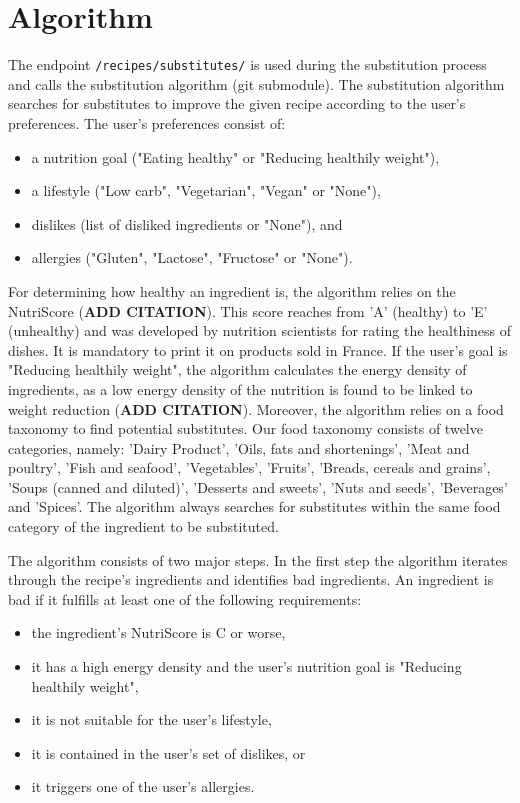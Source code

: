\section{Algorithm} \label{algorithm}
The endpoint \texttt{/recipes/substitutes/} is used during the substitution process and calls the substitution algorithm (git submodule). The substitution algorithm searches for substitutes to improve the given recipe according to the user's preferences. The user's preferences consist of:
\begin{itemize}
	\itemsep-0.5em 
	\item a nutrition goal ("Eating healthy" or "Reducing healthily weight"),
	\item a lifestyle ("Low carb", "Vegetarian", "Vegan" or "None"),
	\item dislikes (list of disliked ingredients or "None"), and
	\item allergies ("Gluten", "Lactose", "Fructose" or "None").
\end{itemize} 
For determining how healthy an ingredient is, the algorithm relies on the NutriScore (\textbf{ADD CITATION}). This score reaches from 'A' (healthy) to 'E' (unhealthy) and was developed by nutrition scientists for rating the healthiness of dishes. It is mandatory to print it on products sold in France. If the user's goal is "Reducing healthily weight", the algorithm calculates the energy density of ingredients, as a low energy density of the nutrition is found to be linked to weight reduction (\textbf{ADD CITATION}). Moreover, the algorithm relies on a food taxonomy to find potential substitutes. Our food taxonomy consists of twelve categories, namely: 'Dairy Product',  'Oils, fats and shortenings', 'Meat and poultry',    'Fish and seafood', 'Vegetables', 'Fruits', 'Breads, cereals and grains', 'Soups (canned and diluted)', 'Desserts and sweets', 'Nuts and seeds', 'Beverages' and 'Spices'. The algorithm always searches for substitutes within the same food category of the ingredient to be substituted.


The algorithm consists of two major steps. In the first step the algorithm iterates through the recipe's ingredients and identifies bad ingredients. An ingredient is bad if it fulfills at least one of the following requirements:
\begin{itemize}
	\itemsep-0.5em 
	\item the ingredient's NutriScore is C or worse,
	\item it has a high energy density and the user's nutrition goal is "Reducing healthily weight",
	\item it is not suitable for the user's lifestyle,
	\item it is contained in the user's set of dislikes, or
	\item it triggers one of the user's allergies.
\end{itemize}


